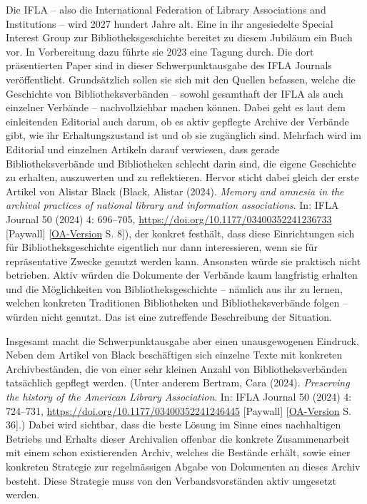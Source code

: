 \documentclass[a4paper,
fontsize=11pt,
oneside,
numbers=noperiodatend,
parskip=half-,
bibliography=totoc,
final
]{scrartcl}
\begin{document}
Die IFLA -- also die International Federation of Library Associations
and Institutions -- wird 2027 hundert Jahre alt. Eine in ihr
angesiedelte Special Interest Group zur Bibliotheksgeschichte bereitet
zu diesem Jubiläum ein Buch vor. In Vorbereitung dazu führte sie 2023
eine Tagung durch. Die dort präsentierten Paper sind in dieser
Schwerpunktausgabe des IFLA Journals veröffentlicht. Grundsätzlich
sollen sie sich mit den Quellen befassen, welche die Geschichte von
Bibliotheksverbänden -- sowohl gesamthaft der IFLA als auch einzelner
Verbände -- nachvollziehbar machen können. Dabei geht es laut dem
einleitenden Editorial auch darum, ob es aktiv gepflegte Archive der
Verbände gibt, wie ihr Erhaltungszustand ist und ob sie zugänglich sind.
Mehrfach wird im Editorial und einzelnen Artikeln darauf verwiesen, dass
gerade Bibliotheksverbände und Bibliotheken schlecht darin sind, die
eigene Geschichte zu erhalten, auszuwerten und zu reflektieren. Hervor
sticht dabei gleich der erste Artikel von Alistar Black (Black, Alistar
(2024). \emph{Memory and amnesia in the archival practices of national
library and information associations}. In: IFLA Journal 50 (2024) 4:
696--705, \url{https://doi.org/10.1177/03400352241236733} {[}Paywall{]}
{[}\href{https://repository.ifla.org/handle/20.500.14598/3703}{OA-Version}
S. 8{]}), der konkret festhält, dass diese Einrichtungen sich für
Bibliotheksgeschichte eigentlich nur dann interessieren, wenn sie für
repräsentative Zwecke genutzt werden kann. Ansonsten würde sie praktisch
nicht betrieben. Aktiv würden die Dokumente der Verbände kaum
langfristig erhalten und die Möglichkeiten von Bibliotheksgeschichte --
nämlich aus ihr zu lernen, welchen konkreten Traditionen Bibliotheken
und Bibliotheksverbände folgen -- würden nicht genutzt. Das ist eine
zutreffende Beschreibung der Situation.

Insgesamt macht die Schwerpunktausgabe aber einen unausgewogenen
Eindruck. Neben dem Artikel von Black beschäftigen sich einzelne Texte
mit konkreten Archivbeständen, die von einer sehr kleinen Anzahl von
Bibliotheksverbänden tatsächlich gepflegt werden. (Unter anderem
Bertram, Cara (2024). \emph{Preserving the history of the American
Library Association}. In: IFLA Journal 50 (2024) 4: 724--731,
\url{https://doi.org/10.1177/03400352241246445} {[}Paywall{]}
{[}\href{https://repository.ifla.org/handle/20.500.14598/3703}{OA-Version}
S. 36{]}.) Dabei wird sichtbar, dass die beste Lösung im Sinne eines
nachhaltigen Betriebs und Erhalts dieser Archivalien offenbar die
konkrete Zusammenarbeit mit einem schon existierenden Archiv, welches
die Bestände erhält, sowie einer konkreten Strategie zur regelmässigen
Abgabe von Dokumenten an dieses Archiv besteht. Diese Strategie muss von
den Verbandsvorständen aktiv umgesetzt werden.
\end{document}
